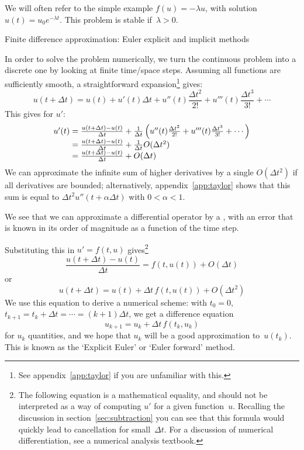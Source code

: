 We will often refer to the simple example
$f(u)=-\lambda u$, with solution $u(t)=u_0e^{-\lambda t}$. This
problem is stable if~$\lambda>0$.

 {Finite difference approximation: Euler explicit and implicit methods}
\label{sec:fd-ode}

In order to solve the problem numerically, we turn the continuous
problem into a discrete one by looking at finite time/space steps.
Assuming all functions are sufficiently smooth, a straightforward
 expansion\footnote{See appendix~\ref{app:taylor} 
if you are unfamiliar with this.} gives:
\[ u(t+\Delta t)=u(t)+u'(t)\Delta t+u''(t)\frac{\Delta t^2}{2!}
+ u'''(t)\frac{\Delta t^3}{3!}+\cdots \]
This gives for $u'$:
\begin{equation}
  \begin{array}{r@{{}={}}l}
  u'(t) & \frac{u(t+\Delta t)-u(t)}{\Delta t}+\frac1{\Delta t}
                \left(u''(t)\frac{\Delta t^2}{2!}
                + u'''(t)\frac{\Delta t^3}{3!}+\cdots\right)\\
        & \frac{u(t+\Delta t)-u(t)}{\Delta t}+\frac1{\Delta t}O(\Delta t^2)\\
        & \frac{u(t+\Delta t)-u(t)}{\Delta t}+O(\Delta t)    
  \end{array}
  \label{eq:forwarddifference}\end{equation}
We can approximate the infinite sum of higher derivatives by a single
$O(\Delta t^2)$ if all derivatives are bounded; alternatively,
appendix~\ref{app:taylor} shows that this sum is equal to $\Delta
t^2u''(t+\alpha\Delta t)$ with $0<\alpha<1$.

We see that we can approximate a differential operator by a
, with an error that is known in its
order of magnitude as a function of the time step.

Substituting this in $u'=f(t,u)$ gives\footnote{The following equation
  is a mathematical equality, and should not be interpreted as a way
  of computing $u'$ for a given function~$u$. Recalling the discussion
  in section~\ref{sec:subtraction} you can see that this formula would
  quickly lead to cancellation for small~$\Delta t$. For a discussion
  of numerical differentiation, see a numerical analysis textbook.}
\[ \frac{u(t+\Delta t)-u(t)}{\Delta t} = f(t,u(t)) +O(\Delta t)\]
or 
\[ u(t+\Delta t) = u(t) + \Delta t\,f(t,u(t)) +O(\Delta t^2) \]
We use this equation to derive a numerical scheme:
with $t_0=0$, $t_{k+1}=t_k+\Delta t=\cdots=(k+1)\Delta t$,
we get a difference equation
\[ u_{k+1}=u_k+\Delta t\,f(t_k,u_k) \]
for $u_k$ quantities, and we hope that $u_k$ will be a good
approximation to~$u(t_k)$.
This is known as the `Explicit Euler' or `Euler forward' method.

